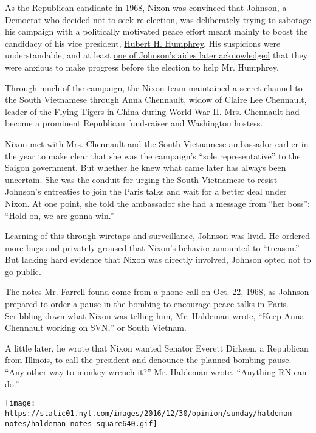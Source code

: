 As the Republican candidate in 1968, Nixon was convinced that Johnson, a
Democrat who decided not to seek re-election, was deliberately trying to
sabotage his campaign with a politically motivated peace effort meant
mainly to boost the candidacy of his vice president,
\href{http://topics.nytimes.com/top/reference/timestopics/people/h/hubert_h_jr_humphrey/index.html}{Hubert
H. Humphrey}. His suspicions were understandable, and at least
\href{http://adst.org/oral-history/fascinating-figures/philip-habib-cursed-is-the-peacemaker/}{one
of Johnson's aides later acknowledged} that they were anxious to make
progress before the election to help Mr. Humphrey.

Through much of the campaign, the Nixon team maintained a secret channel
to the South Vietnamese through Anna Chennault, widow of Claire Lee
Chennault, leader of the Flying Tigers in China during World War II.
Mrs. Chennault had become a prominent Republican fund-raiser and
Washington hostess.

Nixon met with Mrs. Chennault and the South Vietnamese ambassador
earlier in the year to make clear that she was the campaign's ``sole
representative'' to the Saigon government. But whether he knew what came
later has always been uncertain. She was the conduit for urging the
South Vietnamese to resist Johnson's entreaties to join the Paris talks
and wait for a better deal under Nixon. At one point, she told the
ambassador she had a message from ``her boss'': ``Hold on, we are gonna
win.''

Learning of this through wiretaps and surveillance, Johnson was livid.
He ordered more bugs and privately groused that Nixon's behavior
amounted to ``treason.'' But lacking hard evidence that Nixon was
directly involved, Johnson opted not to go public.

The notes Mr. Farrell found come from a phone call on Oct. 22, 1968, as
Johnson prepared to order a pause in the bombing to encourage peace
talks in Paris. Scribbling down what Nixon was telling him, Mr. Haldeman
wrote, ``Keep Anna Chennault working on SVN,'' or South Vietnam.

A little later, he wrote that Nixon wanted Senator Everett Dirksen, a
Republican from Illinois, to call the president and denounce the planned
bombing pause. ``Any other way to monkey wrench it?'' Mr. Haldeman
wrote. ``Anything RN can do.''

\href{https://www.nytimes.com/interactive/2016/12/31/opinion/sunday/haldeman-notes.html}{}

\texttt{[image: https://static01.nyt.com/images/2016/12/30/opinion/sunday/haldeman-notes/haldeman-notes-square640.gif]}

